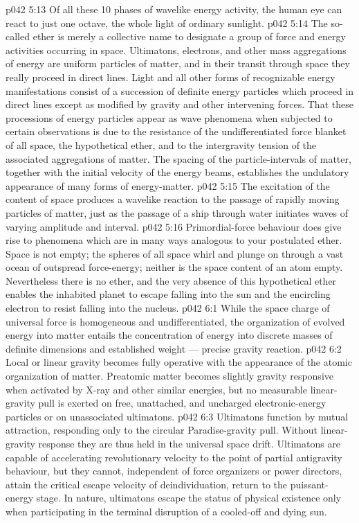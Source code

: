 \vs p042 5:13 \pc Of all these 10 phases of wavelike energy activity, the human eye can react to just one octave, the whole light of ordinary sunlight.
\vs p042 5:14 \pc The so\hyp{}called ether is merely a collective name to designate a group of force and energy activities occurring in space. Ultimatons, electrons, and other mass aggregations of energy are uniform particles of matter, and in their transit through space they really proceed in direct lines. Light and all other forms of recognizable energy manifestations consist of a succession of definite energy particles which proceed in direct lines except as modified by gravity and other intervening forces. That these processions of energy particles appear as wave phenomena when subjected to certain observations is due to the resistance of the undifferentiated force blanket of all space, the hypothetical ether, and to the intergravity tension of the associated aggregations of matter. The spacing of the particle\hyp{}intervals of matter, together with the initial velocity of the energy beams, establishes the undulatory appearance of many forms of energy\hyp{}matter.
\vs p042 5:15 The excitation of the content of space produces a wavelike reaction to the passage of rapidly moving particles of matter, just as the passage of a ship through water initiates waves of varying amplitude and interval.
\vs p042 5:16 Primordial\hyp{}force behaviour does give rise to phenomena which are in many ways analogous to your postulated ether. Space is not empty; the spheres of all space whirl and plunge on through a vast ocean of outspread force\hyp{}energy; neither is the space content of an atom empty. Nevertheless there is no ether, and the very absence of this hypothetical ether enables the inhabited planet to escape falling into the sun and the encircling electron to resist falling into the nucleus.
\vs p042 6:1 While the space charge of universal force is homogeneous and undifferentiated, the organization of evolved energy into matter entails the concentration of energy into discrete masses of definite dimensions and established weight --- precise gravity reaction.
\vs p042 6:2 Local or linear gravity becomes fully operative with the appearance of the atomic organization of matter. Preatomic matter becomes slightly gravity responsive when activated by X\hyp{}ray and other similar energies, but no measurable linear\hyp{}gravity pull is exerted on free, unattached, and uncharged electronic\hyp{}energy particles or on unassociated ultimatons.
\vs p042 6:3 \pc Ultimatons function by mutual attraction, responding only to the circular Paradise\hyp{}gravity pull. Without linear\hyp{}gravity response they are thus held in the universal space drift. Ultimatons are capable of accelerating revolutionary velocity to the point of partial antigravity behaviour, but they cannot, independent of force organizers or power directors, attain the critical escape velocity of deindividuation, return to the puissant\hyp{}energy stage. In nature, ultimatons escape the status of physical existence only when participating in the terminal disruption of a cooled\hyp{}off and dying sun.
